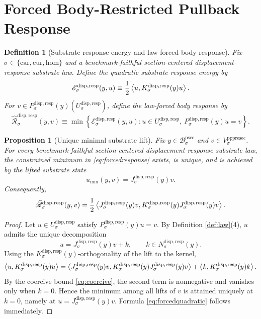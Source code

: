\documentclass[11pt]{article}
\newcommand{\Car}{\mathrm{car}}
\newcommand{\Cur}{\mathrm{cur}}
\newcommand{\Hom}{\mathrm{hom}}
\newcommand{\ProtoSectionBody}[1]{\mathcal B_{#1}^{\mathrm{psec}}}
\newcommand{\PrePreProtoSectionVertical}[1]{V_{#1}^{\mathrm{pppresec}}}
\newcommand{\SubstrateCarrier}[1]{U_{#1}^{\mathrm{disp,resp}}}
\newcommand{\SubstrateProjection}[1]{P_{#1}^{\mathrm{disp,resp}}}
\newcommand{\SubstrateOperator}[1]{K_{#1}^{\mathrm{disp,resp}}}
\newcommand{\SubstrateLift}[1]{J_{#1}^{\mathrm{disp,resp}}}
\newcommand{\SubstrateKernel}[1]{N_{#1}^{\mathrm{disp,resp}}}
\newcommand{\SubstrateEnergy}[1]{\mathscr E_{#1}^{\mathrm{disp,resp}}}
\newcommand{\ForcedBodyResponse}[1]{\widehat{\mathscr R}_{#1}^{\mathrm{disp,resp}}}
\newtheorem{definition}{Definition}
\newtheorem{proposition}{Proposition}
\begin{document}
\section{Forced Body-Restricted Pullback Response}

\begin{definition}[Substrate response energy and law-forced body response]
\label{def:forced}
Fix \(\sigma\in\{\Car,\Cur,\Hom\}\) and a benchmark-faithful section-centered displacement-response substrate law. Define the quadratic substrate response energy by
\[
\SubstrateEnergy{\sigma}(y,u)
\equiv
\frac{1}{2}
\ev{u,\SubstrateOperator{\sigma}(y)u}.
\]
For \(v\in\SubstrateProjection{\sigma}(y)(\SubstrateCarrier{\sigma})\), define the \emph{law-forced body response} by
\begin{equation}
\ForcedBodyResponse{\sigma}(y,v)
\equiv
\min\left\{
\SubstrateEnergy{\sigma}(y,u):
u\in\SubstrateCarrier{\sigma},
\ \SubstrateProjection{\sigma}(y)u=v
\right\}.
\label{eq:forcedresponse}
\end{equation}
\end{definition}

\begin{proposition}[Unique minimal substrate lift]
\label{prop:minlift}
Fix \(y\in\ProtoSectionBody{\sigma}\) and \(v\in\PrePreProtoSectionVertical{\sigma}\). For every benchmark-faithful section-centered displacement-response substrate law, the constrained minimum in \eqref{eq:forcedresponse} exists, is unique, and is achieved by the lifted substrate state
\[
u_{\min}(y,v)
=
\SubstrateLift{\sigma}(y)v.
\]
Consequently,
\begin{equation}
\ForcedBodyResponse{\sigma}(y,v)
=
\frac{1}{2}
\ev{
\SubstrateLift{\sigma}(y)v,
\SubstrateOperator{\sigma}(y)\SubstrateLift{\sigma}(y)v
}.
\label{eq:forcedquadratic}
\end{equation}
\end{proposition}

\begin{proof}
Let \(u\in\SubstrateCarrier{\sigma}\) satisfy \(\SubstrateProjection{\sigma}(y)u=v\). By Definition \ref{def:law}(4), \(u\) admits the unique decomposition
\[
u
=
\SubstrateLift{\sigma}(y)v+k,
\qquad
k\in\SubstrateKernel{\sigma}(y).
\]
Using the \(\SubstrateOperator{\sigma}(y)\)-orthogonality of the lift to the kernel,
\[
\ev{u,\SubstrateOperator{\sigma}(y)u}
=
\ev{
\SubstrateLift{\sigma}(y)v,
\SubstrateOperator{\sigma}(y)\SubstrateLift{\sigma}(y)v
}
+
\ev{k,\SubstrateOperator{\sigma}(y)k}.
\]
By the coercive bound \eqref{eq:coercive}, the second term is nonnegative and vanishes only when \(k=0\). Hence the minimum among all lifts of \(v\) is attained uniquely at \(k=0\), namely at \(u=\SubstrateLift{\sigma}(y)v\). Formula \eqref{eq:forcedquadratic} follows immediately.
\end{proof}
\end{document}
